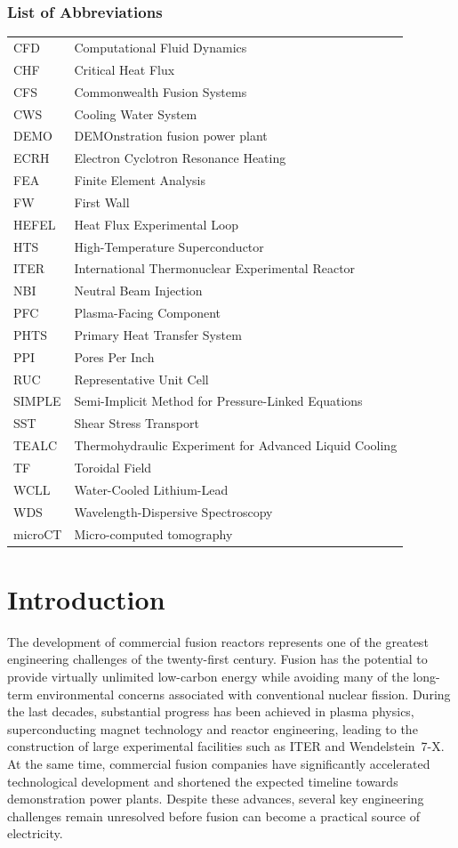 \documentclass[a4paper]{article}
\begin{document}
\section*{List of Abbreviations}
\begin{tabular}{ll}
CFD & Computational Fluid Dynamics \\
CHF & Critical Heat Flux \\
CFS & Commonwealth Fusion Systems \\
CWS & Cooling Water System \\
DEMO & DEMOnstration fusion power plant \\
ECRH & Electron Cyclotron Resonance Heating \\
FEA & Finite Element Analysis \\
FW & First Wall \\
HEFEL & Heat Flux Experimental Loop \\
HTS & High-Temperature Superconductor \\
ITER & International Thermonuclear Experimental Reactor \\
NBI & Neutral Beam Injection \\
PFC & Plasma-Facing Component \\
PHTS & Primary Heat Transfer System \\
PPI & Pores Per Inch \\
RUC & Representative Unit Cell \\
SIMPLE & Semi-Implicit Method for Pressure-Linked Equations \\
SST & Shear Stress Transport \\
TEALC & Thermohydraulic Experiment for Advanced Liquid Cooling \\
TF & Toroidal Field \\
WCLL & Water-Cooled Lithium-Lead \\
WDS & Wavelength-Dispersive Spectroscopy \\
microCT & Micro-computed tomography \\
\end{tabular}
\pagebreak

\part{Introduction}

The development of commercial fusion reactors represents one of the greatest engineering challenges of the twenty-first century. Fusion has the potential to provide virtually unlimited low-carbon energy while avoiding many of the long-term environmental concerns associated with conventional nuclear fission. During the last decades, substantial progress has been achieved in plasma physics, superconducting magnet technology and reactor engineering, leading to the construction of large experimental facilities such as ITER and Wendelstein~7-X. At the same time, commercial fusion companies have significantly accelerated technological development and shortened the expected timeline towards demonstration power plants. Despite these advances, several key engineering challenges remain unresolved before fusion can become a practical source of electricity.
\end{document}
